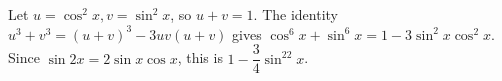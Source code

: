 Let $u=\cos^2x,v=\sin^2x$, so $u+v=1$. The identity $u^3+v^3=(u+v)^3-3uv(u+v)$ gives $\cos^6x+\sin^6x=1-3\sin^2x\cos^2x$. Since $\sin2x=2\sin x\cos x$, this is $1-\dfrac{3}{4}\sin^22x$.
